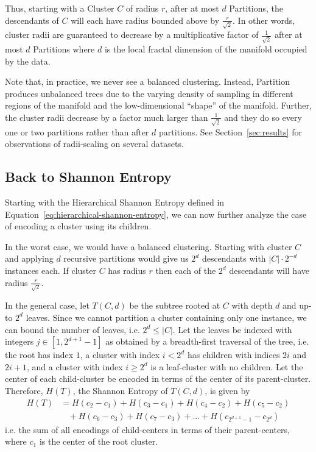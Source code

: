 Thus, starting with a Cluster $C$ of radius $r$, after at most $d$ Partitions, the descendants of $C$ will each have radius bounded above by $\frac{r}{\sqrt{2}}$.
In other words, cluster radii are guaranteed to decrease by a multiplicative factor of $\frac{1}{\sqrt{2}}$ after at most $d$ Partitions where $d$ is the local fractal dimension of the manifold occupied by the data.

Note that, in practice, we never see a balanced clustering.
Instead, Partition produces unbalanced trees due to the varying density of sampling in different regions of the manifold and the low-dimensional ``shape'' of the manifold.
Further, the cluster radii decrease by a factor much larger than $\frac{1}{\sqrt{2}}$ and they do so every one or two partitions rather than after $d$ partitions.
See Section~\ref{sec:results} for observations of radii-scaling on several datasets.


\subsection{Back to Shannon Entropy}
\label{subsec:methods:back-to-shannon-entropy}

Starting with the Hierarchical Shannon Entropy defined in Equation~\ref{eq:hierarchical-shannon-entropy}, we can now further analyze the case of encoding a cluster using its children.

In the worst case, we would have a balanced clustering.
Starting with cluster $C$ and applying $d$ recursive partitions would give us $2^d$ descendants with $|C| \cdot 2^{-d}$ instances each.
If cluster $C$ has radius $r$ then each of the $2^d$ descendants will have radius $\frac{r}{\sqrt{2}}$.

In the general case, let $T(C, d)$ be the subtree rooted at $C$ with depth $d$ and up-to $2^d$ leaves.
Since we cannot partition a cluster containing only one instance, we can bound the number of leaves, i.e. $2^d \leq |C|$.
Let the leaves be indexed with integers $j \in [1, 2^{d + 1} - 1]$ as obtained by a breadth-first traversal of the tree, i.e. the root has index $1$, a cluster with index $i < 2^d$ has children with indices $2i$ and $2i + 1$, and a cluster with index $i \geq 2^d$ is a leaf-cluster with no children.
Let the center of each child-cluster be encoded in terms of the center of its parent-cluster.
Therefore, $H(T)$, the Shannon Entropy of $T(C, d)$, is given by
\begin{align*}
    H(T) &= H(c_2 - c_1) + H(c_3 - c_1) + H(c_4 - c_2) + H(c_5 - c_2) \\
    & \ \ \ \ + H(c_6 - c_3) + H(c_7 - c_3) + \dots + H(c_{2^{d + 1} - 1} - c_{2^d})
\end{align*}
i.e. the sum of all encodings of child-centers in terms of their parent-centers, where $c_1$ is the center of the root cluster.

